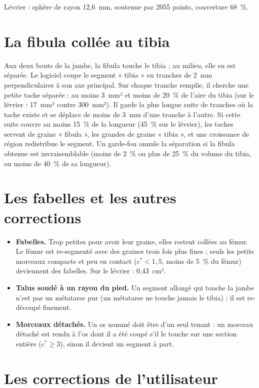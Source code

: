 \begin{exemple}
Lévrier : sphère de rayon 12,6~mm, soutenue par 2055 points, couverture 68~\%.
\end{exemple}

\section{La fibula collée au tibia}
\label{sec:fibula}

Aux deux bouts de la jambe, la fibula touche le tibia ; au milieu, elle en est séparée. Le logiciel coupe le segment
« tibia » en tranches de 2~mm perpendiculaires à son axe principal. Sur chaque tranche remplie, il cherche une petite
tache séparée : au moins 3~mm² et moins de 20~\% de l'aire du tibia (sur le lévrier : 17~mm² contre 300~mm²). Il garde
la plus longue suite de tranches où la tache existe et se déplace de moins de 3~mm d'une tranche à l'autre. Si cette
suite couvre au moins 15~\% de la longueur (45~\% sur le lévrier), les taches servent de graine « fibula », les grandes
de graine « tibia », et une croissance de région redistribue le segment. Un garde-fou annule la séparation si la
fibula obtenue est invraisemblable (moins de 2~\% ou plus de 25~\% du volume du tibia, ou moins de 40~\% de sa longueur).

\section{Les fabelles et les autres corrections}

\begin{itemize}
  \item \textbf{Fabelles.} Trop petites pour avoir leur graine, elles restent collées au fémur. Le fémur est
  re-segmenté avec des graines trois fois plus fines ; seuls les petits morceaux compacts et peu en contact
  ($c^* < 1{,}5$, moins de 5~\% du fémur) deviennent des fabelles. Sur le lévrier : 0,43~cm³.
  \item \textbf{Talus soudé à un rayon du pied.} Un segment allongé qui touche la jambe n'est pas un métatarse pur (un
  métatarse ne touche jamais le tibia) : il est re-découpé finement.
  \item \textbf{Morceaux détachés.} Un os nommé doit être d'un seul tenant : un morceau détaché est rendu à l'os dont
  il a été coupé s'il le touche sur une section entière ($c^* \geq 3$), sinon il devient un segment à part.
\end{itemize}

\section{Les corrections de l'utilisateur}

